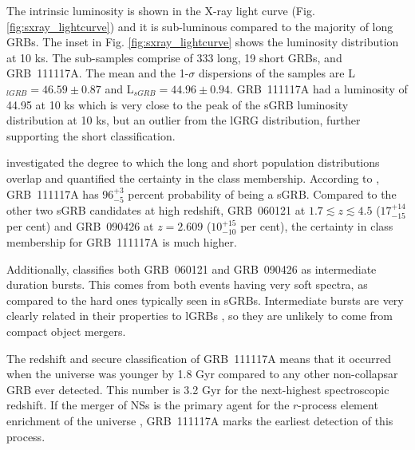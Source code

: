 \documentclass{aa}    %
\begin{document}
The intrinsic luminosity is shown in the X-ray light curve (Fig.
\ref{fig:sxray_lightcurve}) and it is sub-luminous compared to the majority of
long GRBs. The inset in Fig. \ref{fig:sxray_lightcurve} shows the luminosity
distribution at 10 ks. The sub-samples comprise of 333 long, 19 short GRBs, and
GRB~111117A. The mean and the 1-$\sigma$ dispersions of the samples are
L$_{lGRB} = 46.59 \pm 0.87$ and L$_{sGRB} = 44.96 \pm 0.94$. GRB~111117A had a
luminosity of 44.95 at 10 ks which is very close to the peak of the sGRB
luminosity distribution at 10 ks, but an outlier from the lGRG distribution,
further supporting the short classification.

\citet{Bromberg2013} investigated the degree to which the long and short
population distributions overlap and quantified the certainty in the class
membership. According to \citet{Bromberg2013}, GRB~111117A has $96_{-5}^{+3}$
percent probability of being a sGRB. Compared to the other two sGRB candidates
at high redshift, GRB~060121 \citep{DeUgartePostigo2006, Levan2006} at $1.7
\lesssim z \lesssim 4.5$ ($17_{-15}^{+14}$ per cent) and GRB~090426
\citep{Antonelli2009, Levesque2010, Thone2011} at $z = 2.609$ ($10_{-10}^{+15}$
per cent), the certainty in class membership for GRB~111117A is much higher.

Additionally, \citet{Horvath2010} classifies both GRB~060121 and GRB~090426 as
intermediate duration bursts. This comes from both events having very soft
spectra, as compared to the hard ones typically seen in sGRBs. Intermediate
bursts are very clearly related in their properties to lGRBs
\citep{DeUgartePostigo2011}, so they are unlikely to come from compact object
mergers.

The redshift and secure classification of GRB~111117A means that it occurred
when the universe was younger by 1.8 Gyr compared to any other non-collapsar GRB
ever detected. This number is 3.2 Gyr for the next-highest spectroscopic
redshift. If the merger of NSs is the primary agent for the $r$-process element
enrichment of the universe \citep{Goriely2011, Ji2016, Komiya2016}, GRB~111117A
marks the earliest detection of this process.
\end{document}
